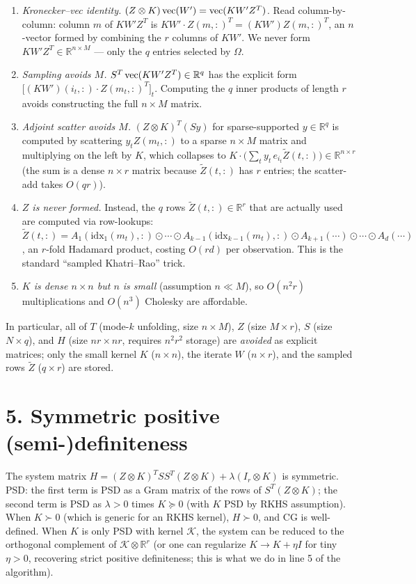 \begin{enumerate}\setlength\itemsep{4pt}
\item \emph{Kronecker--vec identity.}  $(Z\otimes K)\operatorname{vec}(W')=\operatorname{vec}(KW'Z^T)$.  Read column-by-column: column $m$ of $KW'Z^T$ is $KW'\cdot Z(m,:)^T = (KW')Z(m,:)^T$, an $n$-vector formed by combining the $r$ columns of $KW'$.  We never form $KW'Z^T\in\mathbb R^{n\times M}$ — only the $q$ entries selected by $\Omega$.
\item \emph{Sampling avoids $M$.}  $S^T\operatorname{vec}(KW'Z^T)\in\mathbb R^q$ has the explicit form $\bigl[(KW')(i_t,:)\cdot Z(m_t,:)^T\bigr]_{t}$.  Computing the $q$ inner products of length $r$ avoids constructing the full $n\times M$ matrix.
\item \emph{Adjoint scatter avoids $M$.}  $(Z\otimes K)^T(S y)$ for sparse-supported $y\in\mathbb R^q$ is computed by scattering $y_t Z(m_t,:)$ to a sparse $n\times M$ matrix and multiplying on the left by $K$, which collapses to $K\cdot\bigl(\sum_t y_t\,e_{i_t}\widetilde Z(t,:)\bigr)\in\mathbb R^{n\times r}$ (the sum is a dense $n\times r$ matrix because $\widetilde Z(t,:)$ has $r$ entries; the scatter-add takes $O(qr)$).
\item \emph{$Z$ is never formed.}  Instead, the $q$ rows $\widetilde Z(t,:)\in\mathbb R^r$ that are actually used are computed via row-lookups: $\widetilde Z(t,:)=A_1(\mathrm{idx}_1(m_t),:)\odot\cdots\odot A_{k-1}(\mathrm{idx}_{k-1}(m_t),:)\odot A_{k+1}(\cdots)\odot\cdots\odot A_d(\cdots)$, an $r$-fold Hadamard product, costing $O(rd)$ per observation.  This is the standard ``sampled Khatri--Rao'' trick.
\item \emph{$K$ is dense $n\times n$ but $n$ is small} (assumption $n\ll M$), so $O(n^2r)$ multiplications and $O(n^3)$ Cholesky are affordable.
\end{enumerate}

In particular, all of $T$ (mode-$k$ unfolding, size $n\times M$), $Z$ (size $M\times r$), $S$ (size $N\times q$), and $H$ (size $nr\times nr$, requires $n^2r^2$ storage) are \emph{avoided} as explicit matrices; only the small kernel $K$ ($n\times n$), the iterate $W$ ($n\times r$), and the sampled rows $\widetilde Z$ ($q\times r$) are stored.

\section*{5. Symmetric positive (semi-)definiteness}

The system matrix $H=(Z\otimes K)^TSS^T(Z\otimes K)+\lambda(I_r\otimes K)$ is symmetric.  PSD: the first term is PSD as a Gram matrix of the rows of $S^T(Z\otimes K)$; the second term is PSD as $\lambda>0$ times $K\succeq 0$ (with $K$ PSD by RKHS assumption).  When $K\succ 0$ (which is generic for an RKHS kernel), $H\succ 0$, and CG is well-defined.  When $K$ is only PSD with kernel $\mathcal K$, the system can be reduced to the orthogonal complement of $\mathcal K\otimes\mathbb R^r$ (or one can regularize $K\to K+\eta I$ for tiny $\eta>0$, recovering strict positive definiteness; this is what we do in line 5 of the algorithm).

